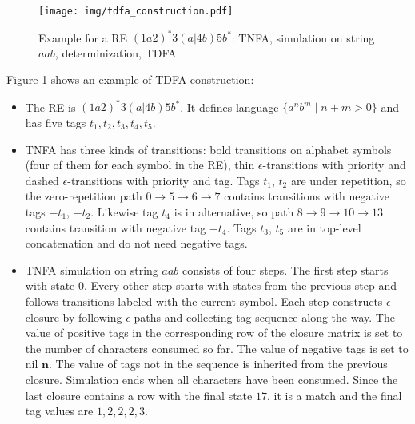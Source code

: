 \documentclass[]{article}
\begin{document}
\begin{figure}%
\texttt{[image: img/tdfa\_construction.pdf]}
\vspace{0.1em}
\caption{
Example for a RE $(1a2)^*3(a|4b)5b^*$: TNFA, simulation on string $aab$, determinization, TDFA.
}\label{fig:tdfa}
\end{figure}

Figure \ref{fig:tdfa} shows an example of TDFA construction:

\medskip

\begin{itemize}

\item[\ding{212}]
The RE is $(1a2)^*3(a|4b)5b^*$. It defines language $\{a^n b^m \mid n + m > 0 \}$
and has five tags $t_1, t_2, t_3, t_4, t_5$.
\medskip

\item[\ding{212}]
TNFA has three kinds of transitions:
bold transitions on alphabet symbols (four of them for each symbol in the RE),
thin $\epsilon$-transitions with priority
and dashed $\epsilon$-transitions with priority and tag.
Tags $t_1$, $t_2$ are under repetition, so the zero-repetition path $0 \!\rightarrow\! 5 \!\rightarrow\! 6 \!\rightarrow\! 7$ contains transitions with negative tags $-t_1$, $-t_2$.
Likewise tag $t_4$ is in alternative, so path $8 \!\rightarrow\! 9 \!\rightarrow\! 10 \!\rightarrow\! 13$ contains transition with negative tag $-t_4$.
Tags $t_3$, $t_5$ are in top-level concatenation and do not need negative tags.
\medskip

\item[\ding{212}]
TNFA simulation on string $aab$ consists of four steps.
The first step starts with state $0$.
Every other step starts with states from the previous step and follows transitions labeled with the current symbol.
Each step constructs $\epsilon$-closure by following $\epsilon$-paths and collecting tag sequence along the way.
The value of positive tags in the corresponding row of the closure matrix is set to the number of characters consumed so far.
The value of negative tags is set to nil $\mathbf{n}$.
The value of tags not in the sequence is inherited from the previous closure.
Simulation ends when all characters have been consumed.
Since the last closure contains a row with the final state $17$, it is a match and the final tag values are $1, 2, 2, 2, 3$.
\medskip


\end{itemize}
\end{document}
